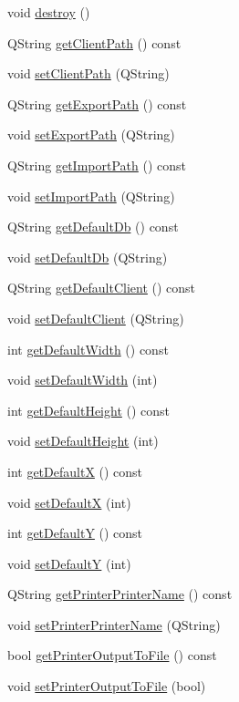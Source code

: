 \begin{CompactItemize}
\item 
void \hyperlink{classSettings_a0}{destroy} ()
\item 
QString \hyperlink{classSettings_a1}{get\-Client\-Path} () const
\item 
void \hyperlink{classSettings_a2}{set\-Client\-Path} (QString)
\item 
QString \hyperlink{classSettings_a3}{get\-Export\-Path} () const
\item 
void \hyperlink{classSettings_a4}{set\-Export\-Path} (QString)
\item 
QString \hyperlink{classSettings_a5}{get\-Import\-Path} () const
\item 
void \hyperlink{classSettings_a6}{set\-Import\-Path} (QString)
\item 
QString \hyperlink{classSettings_a7}{get\-Default\-Db} () const
\item 
void \hyperlink{classSettings_a8}{set\-Default\-Db} (QString)
\item 
QString \hyperlink{classSettings_a9}{get\-Default\-Client} () const
\item 
void \hyperlink{classSettings_a10}{set\-Default\-Client} (QString)
\item 
int \hyperlink{classSettings_a11}{get\-Default\-Width} () const
\item 
void \hyperlink{classSettings_a12}{set\-Default\-Width} (int)
\item 
int \hyperlink{classSettings_a13}{get\-Default\-Height} () const
\item 
void \hyperlink{classSettings_a14}{set\-Default\-Height} (int)
\item 
int \hyperlink{classSettings_a15}{get\-Default\-X} () const
\item 
void \hyperlink{classSettings_a16}{set\-Default\-X} (int)
\item 
int \hyperlink{classSettings_a17}{get\-Default\-Y} () const
\item 
void \hyperlink{classSettings_a18}{set\-Default\-Y} (int)
\item 
QString \hyperlink{classSettings_a19}{get\-Printer\-Printer\-Name} () const
\item 
void \hyperlink{classSettings_a20}{set\-Printer\-Printer\-Name} (QString)
\item 
bool \hyperlink{classSettings_a21}{get\-Printer\-Output\-To\-File} () const
\item 
void \hyperlink{classSettings_a22}{set\-Printer\-Output\-To\-File} (bool)

\end{CompactItemize}
